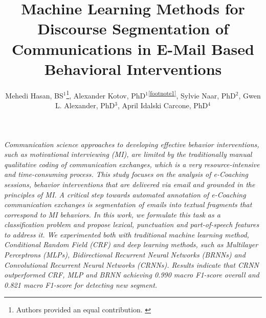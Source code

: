 \documentclass{amia}
\begin{document}
\title{Machine Learning Methods for Discourse Segmentation of Communications in E-Mail Based Behavioral Interventions}

\author{Mehedi Hasan, BS$^{1}$\footnote[1]{Authors provided an equal contribution. \label{footnote1}}, Alexander Kotov, PhD$^{1}$\textsuperscript{\ref{footnote1}}, Sylvie Naar, PhD$^{2}$, Gwen L. Alexander, PhD$^{3}$, April Idalski Carcone, PhD$^{4}$}


\maketitle

\textit{Communication science approaches to developing effective behavior interventions, such as motivational interviewing (MI), are limited by the traditionally manual qualitative coding of communication exchanges, which is a very resource-intensive and time-consuming process. This study focuses on the analysis of e-Coaching sessions, behavior interventions that are delivered via email and grounded in the principles of MI. A critical step towards automated annotation of e-Coaching communication exchanges is segmentation of emails into textual fragments that correspond to MI behaviors. In this work, we formulate this task as a classification problem and propose lexical, punctuation and part-of-speech features to address it. We experimented both with traditional machine learning method, Conditional Random Field (CRF) and deep learning methods, such as Multilayer Perceptrons (MLPs), Bidirectional Recurrent Neural Networks (BRNNs) and Convolutional Recurrent Neural Networks (CRNNs). Results indicate that CRNN outperformed CRF, MLP and BRNN achieving 0.990 macro F1-score overall and 0.821 macro F1-score for detecting new segment.}
\end{document}
